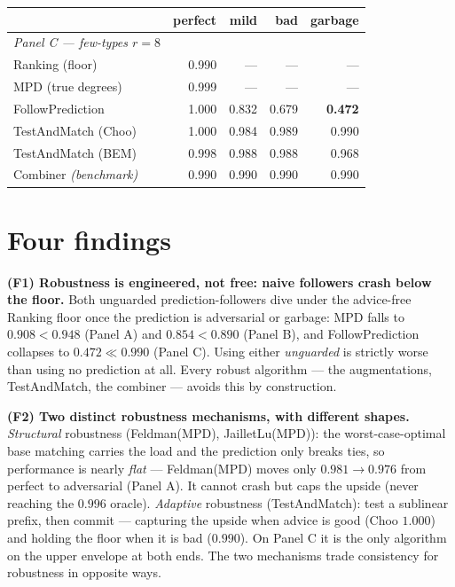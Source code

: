 {\def\LTcaptype{none} %
\begin{longtable}[]{@{}lrrrr@{}}
\toprule\noalign{}
& perfect & mild & bad & garbage \\
\midrule\noalign{}
\endhead
\bottomrule\noalign{}
\endlastfoot
\emph{Panel C --- few-types \(r{=}8\)} & & & & \\
Ranking (floor) & 0.990 & --- & --- & --- \\
MPD (true degrees) & 0.999 & --- & --- & --- \\
FollowPrediction & 1.000 & 0.832 & 0.679 & \textbf{0.472} \\
TestAndMatch (Choo) & 1.000 & 0.984 & 0.989 & 0.990 \\
TestAndMatch (BEM) & 0.998 & 0.988 & 0.988 & 0.968 \\
Combiner \emph{(benchmark)} & 0.990 & 0.990 & 0.990 & 0.990 \\
\end{longtable}
}

\section{Four findings}\label{four-findings}

\textbf{(F1) Robustness is engineered, not free: naive followers crash below the floor.} Both
unguarded prediction-followers dive under the advice-free Ranking floor once the prediction
is adversarial or garbage: MPD falls to \(0.908<0.948\) (Panel A) and \(0.854<0.890\) (Panel
B), and FollowPrediction collapses to \(0.472\ll0.990\) (Panel C). Using either \emph{unguarded}
is strictly worse than using no prediction at all. Every robust algorithm --- the
augmentations, TestAndMatch, the combiner --- avoids this by construction.

\textbf{(F2) Two distinct robustness mechanisms, with different shapes.} \emph{Structural} robustness
(Feldman(MPD), JailletLu(MPD)): the worst-case-optimal base matching carries the load and
the prediction only breaks ties, so performance is nearly \emph{flat} --- Feldman(MPD) moves only
\(0.981\!\to\!0.976\) from perfect to adversarial (Panel A). It cannot crash but caps the
upside (never reaching the \(0.996\) oracle). \emph{Adaptive} robustness (TestAndMatch): test a
sublinear prefix, then commit --- capturing the upside when advice is good (Choo \(1.000\)) and
holding the floor when it is bad (\(0.990\)). On Panel C it is the only algorithm on the upper
envelope at both ends. The two mechanisms trade consistency for robustness in opposite ways.

